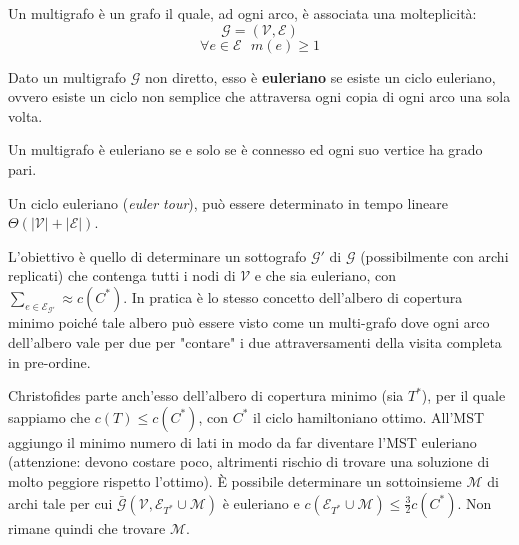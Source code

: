 \begin{definizione}
Un multigrafo è un grafo il quale, ad ogni arco, è associata una molteplicità:
\[
\mathcal{G}=(\mathcal{V}, \mathcal{E})
\]
\[
\forall e \in \mathcal{E}\,\,\,\, m(e) \geq 1
\]
\end{definizione}

\begin{definizione}
Dato un multigrafo $\mathcal{G}$ non diretto, esso è \textbf{euleriano} se esiste un ciclo euleriano, ovvero esiste un ciclo non semplice che attraversa ogni copia di ogni arco una sola volta.
\end{definizione}

\begin{teorema}
Un multigrafo è euleriano se e solo se è connesso ed ogni suo vertice ha grado pari.
\end{teorema}

Un ciclo euleriano (\textit{euler tour}), può essere determinato in tempo lineare $\Theta (|\mathcal{V}|+|\mathcal{E}|)$.

L'obiettivo è quello di determinare un sottografo $\mathcal{G}'$ di $\mathcal{G}$ (possibilmente con archi replicati) che contenga tutti i nodi di $\mathcal{V}$ e che sia euleriano, con $\sum_{e\in\mathcal{E}_{\mathcal{G}'}} \approx c(C^*)$. In pratica è lo stesso concetto dell'albero di copertura minimo poiché tale albero può essere visto come un multi-grafo dove ogni arco dell'albero vale per due per "contare" i due attraversamenti della visita completa in pre-ordine.

Christofides parte anch'esso dell'albero di copertura minimo (sia $T^*$), per il quale sappiamo che $c(T) \leq c(C^*)$, con $C^*$ il ciclo hamiltoniano ottimo. All'MST aggiungo il minimo numero di lati in modo da far diventare l'MST euleriano (attenzione: devono costare poco, altrimenti rischio di trovare una soluzione di molto peggiore rispetto l'ottimo). È possibile determinare un sottoinsieme $\mathcal{M}$ di archi tale per cui $\bar{\mathcal{G}}(\mathcal{V}, \mathcal{E}_{T^*} \cup \mathcal{M})$ è euleriano e $c(\mathcal{E}_{T^*} \cup \mathcal{M}) \leq \frac{3}{2}c(C^*)$. Non rimane quindi che trovare $\mathcal{M}$.

